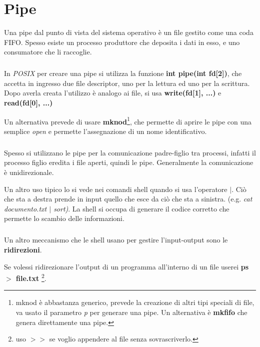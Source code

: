 \chapter{Pipe}
\thispagestyle{empty}

Una pipe dal punto di vista del sistema operativo è un file gestito come una coda FIFO. 
Spesso esiste un processo produttore che deposita i dati in esso, e uno consumatore che li raccoglie.

\paragraph*{}
In \textit{POSIX} per creare una pipe si utilizza la funzione \textbf{int pipe(int fd[2])}, che accetta in ingresso due file descriptor, uno per la lettura ed uno per la scrittura.
Dopo averla creata l'utilizzo è analogo ai file, si usa \textbf{write(fd[1], ...)} e \textbf{read(fd[0], ...)}

Un alternativa prevede di usare \textbf{mknod}\footnote{mknod è abbastanza generico, prevede la creazione di altri tipi speciali di file, va usato il parametro \textit{p} per generare una pipe. Un alternativa è \textbf{mkfifo} che genera direttamente una pipe.}, che permette di aprire le pipe con una semplice \textit{open} e permette l'assegnazione di un nome identificativo.

\paragraph*{}
Spesso si utilizzano le pipe per la comunicazione padre-figlio tra processi, infatti il processo figlio eredita i file aperti, quindi le pipe. Generalmente la comunicazione è unidirezionale.

Un altro uso tipico lo si vede nei comandi shell quando si usa l'operatore \textbf{$\vert$}. Ciò che sta a destra prende in  input quello che esce da ciò che sta a sinistra. (e.g. \textit{cat documento.txt $\vert$ sort)}. La shell si occupa di generare il codice corretto che permette lo scambio delle informazioni.

\paragraph*{}
Un altro meccanismo che le shell usano per gestire l'input-output sono le \textbf{ridirezioni}. 

Se volessi ridirezionare l'output di un programma all'interno di un file userei \textbf{ps $>$ file.txt} \footnote{uso \textbf{$>>$} se voglio appendere al file senza sovrascriverlo.}. 

